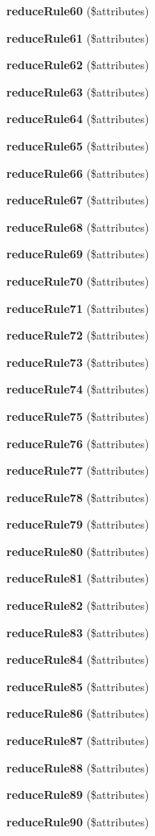 \begin{DoxyCompactItemize}
\item 
{\bf reduce\+Rule60} (\$attributes)
\item 
{\bf reduce\+Rule61} (\$attributes)
\item 
{\bf reduce\+Rule62} (\$attributes)
\item 
{\bf reduce\+Rule63} (\$attributes)
\item 
{\bf reduce\+Rule64} (\$attributes)
\item 
{\bf reduce\+Rule65} (\$attributes)
\item 
{\bf reduce\+Rule66} (\$attributes)
\item 
{\bf reduce\+Rule67} (\$attributes)
\item 
{\bf reduce\+Rule68} (\$attributes)
\item 
{\bf reduce\+Rule69} (\$attributes)
\item 
{\bf reduce\+Rule70} (\$attributes)
\item 
{\bf reduce\+Rule71} (\$attributes)
\item 
{\bf reduce\+Rule72} (\$attributes)
\item 
{\bf reduce\+Rule73} (\$attributes)
\item 
{\bf reduce\+Rule74} (\$attributes)
\item 
{\bf reduce\+Rule75} (\$attributes)
\item 
{\bf reduce\+Rule76} (\$attributes)
\item 
{\bf reduce\+Rule77} (\$attributes)
\item 
{\bf reduce\+Rule78} (\$attributes)
\item 
{\bf reduce\+Rule79} (\$attributes)
\item 
{\bf reduce\+Rule80} (\$attributes)
\item 
{\bf reduce\+Rule81} (\$attributes)
\item 
{\bf reduce\+Rule82} (\$attributes)
\item 
{\bf reduce\+Rule83} (\$attributes)
\item 
{\bf reduce\+Rule84} (\$attributes)
\item 
{\bf reduce\+Rule85} (\$attributes)
\item 
{\bf reduce\+Rule86} (\$attributes)
\item 
{\bf reduce\+Rule87} (\$attributes)
\item 
{\bf reduce\+Rule88} (\$attributes)
\item 
{\bf reduce\+Rule89} (\$attributes)
\item 
{\bf reduce\+Rule90} (\$attributes)
\item 

\end{DoxyCompactItemize}

